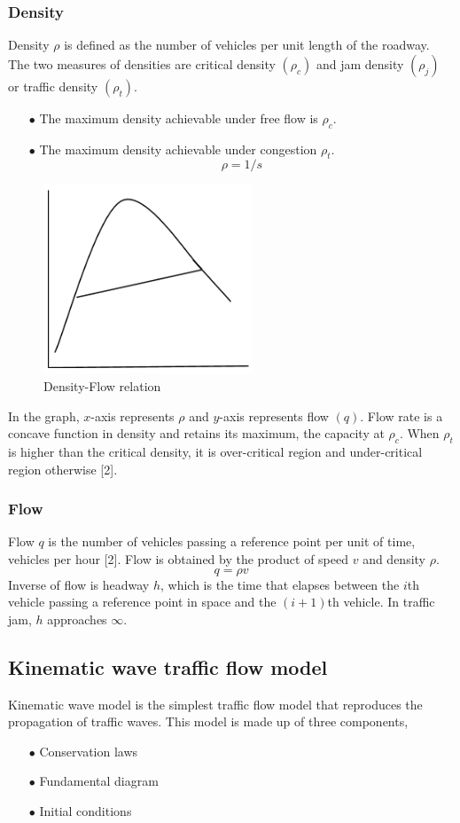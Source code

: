 \documentclass[12pt,a4paper]{report}
\begin{document}
	\subsubsection*{Density}
	Density $\rho$ is defined as the number of vehicles per unit length of the roadway. The two measures of densities are critical density $(\rho_c)$ and jam density $(\rho_j)$ or traffic density $(\rho_t)$.
	\begin{itemize}
		\item[$\bullet$] The maximum density	achievable under free flow is $\rho_c$.
		\item[$\bullet$] The maximum density achievable under congestion $\rho_t$.
		$$\rho = 1/s$$
	\end{itemize}
	\begin{figure}[hbtp]
		\centering
		\includegraphics[scale=1]{grph.png}
		\caption{Density-Flow relation}
	\end{figure}
	In the graph, $x$-axis represents $\rho$ and $y$-axis represents flow $(q)$. Flow rate is a concave function in density and retains its maximum, the capacity at $\rho_c$. When $\rho_t$ is higher than the critical density, it is over-critical region and under-critical region otherwise [2].
	\subsubsection*{Flow}
	Flow $q$ is the number of vehicles passing a reference point per unit of time, vehicles per hour [2]. Flow is obtained by the product of speed $v$ and density $\rho$.
	$$q = \rho v$$ Inverse of flow is headway $h$, which is the time that elapses between the $i$th vehicle passing a reference point in space and the $(i+1)$th vehicle. In traffic jam, $h$ approaches $\infty$.
	\subsection*{Kinematic wave traffic flow model}
	Kinematic wave model is the simplest traffic flow model that reproduces the propagation of traffic waves. This model is made up of three components,
	\begin{itemize}
		\item[$\bullet$] Conservation laws
		\item[$\bullet$] Fundamental diagram
		\item[$\bullet$] Initial conditions
	\end{itemize}
\end{document}
